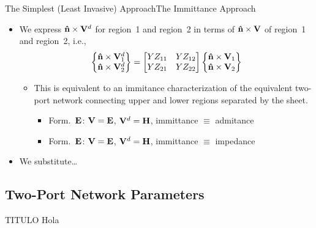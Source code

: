 
\begin{frame}[allowframebreaks]{The Simplest (Least Invasive)
    Approach}{The Immittance Approach}
  
  \begin{itemize}\setlength{\itemsep}{0.3\baselineskip}
  \item We express $\mathbf{\hat{n}}\times\mathbf{V}^d$ for region~1 and region~2 in terms of 
    $\mathbf{\hat{n}}\times\mathbf{V}$ of region~1 and region~2, i.e.,
    \begin{equation*}
      \begin{Bmatrix}
        \mathbf{\hat{n}}\times\mathbf{V}^d_1 \\ \mathbf{\hat{n}}\times\mathbf{V}^d_2
      \end{Bmatrix} =
      \begin{bmatrix}
        YZ_{11} & YZ_{12} \\ YZ_{21}  & YZ_{22}
      \end{bmatrix}
      \begin{Bmatrix}
        \mathbf{\hat{n}}\times\mathbf{V}_1 \\ \mathbf{\hat{n}}\times\mathbf{V}_2
      \end{Bmatrix} 
    \end{equation*}

    \begin{itemize}
    \item  This is equivalent to an immitance characterization of
      the equivalent two-port network connecting upper and lower
      regions separated by the sheet.
      \begin{itemize}
      \item Form.\ $\mathbf{E}$: $\mathbf{V}=\mathbf{E}$, $\mathbf{V}^d=\mathbf{H}$, immittance $\equiv$ admitance 
      \item Form.\ $\mathbf{E}$: $\mathbf{V}=\mathbf{E}$, $\mathbf{V}^d=\mathbf{H}$, immittance $\equiv$ impedance 
      \end{itemize}
    \end{itemize}

    \framebreak  %
    
  \item We substitute\ldots
    
  
  \end{itemize}
  
  
\end{frame}




\subsection{Two-Port Network Parameters}

\begin{frame}{TITULO}
  Hola
\end{frame}



